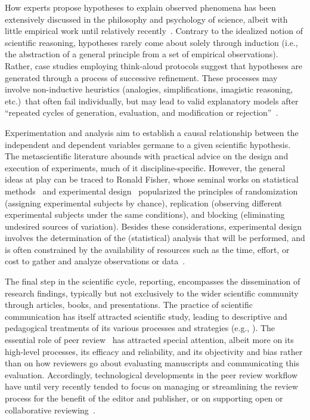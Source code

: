 How experts propose hypotheses to explain observed phenomena has been extensively discussed in the philosophy and psychology of science, albeit with little empirical work until relatively recently~\cite{clement1989learning,clement2022multiple}.  Contrary to the idealized notion of scientific reasoning, hypotheses rarely come about solely through induction (i.e., the abstraction of a general principle from a set of empirical observations).  Rather, case studies employing think-aloud protocols suggest that hypotheses are generated through a process of successive refinement.  These processes may involve non-inductive heuristics (analogies, simplifications, imagistic reasoning, etc.)\ that often fail individually, but may lead to valid explanatory models after ``repeated cycles of generation, evaluation, and modification or rejection''~\cite{clement1989learning,clement2022multiple}.

Experimentation and analysis aim to establish a causal relationship between the independent and dependent variables germane to a given scientific hypothesis.  The metascientific literature abounds with practical advice on the design and execution of experiments, much of it discipline-specific. However, the general ideas at play can be traced to Ronald Fisher, whose seminal works on statistical methods~\cite{fisher1925statistical} and experimental design~\cite{fisher1935design} popularized the principles of randomization (assigning experimental subjects by chance), replication (observing different experimental subjects under the same conditions), and blocking (eliminating undesired sources of variation).  Besides these considerations, experimental design involves the determination of the (statistical) analysis that will be performed, and is often constrained by the availability of resources such as the time, effort, or cost to gather and analyze observations or data~\cite{kirk2009experimental}.

The final step in the scientific cycle, reporting, encompasses the dissemination of research findings, typically but not exclusively to the wider scientific community through articles, books, and presentations.  The practice of scientific communication has itself attracted scientific study, leading to descriptive and pedagogical treatments of its various processes and strategies (e.g., \cite{yore2004scientists,hartley2008academic}).  The essential role of peer review~\cite{weller2001editorial} has attracted special attention, albeit more on its high-level processes, its efficacy and reliability, and its objectivity and bias rather than on how reviewers go about evaluating manuscripts and communicating this evaluation.  Accordingly, technological developments in the peer review workflow have until very recently tended to focus on managing or streamlining the review process for the benefit of the editor and publisher, or on supporting open or collaborative reviewing~\cite{weller2001editorial,drozdz2024peer}.


